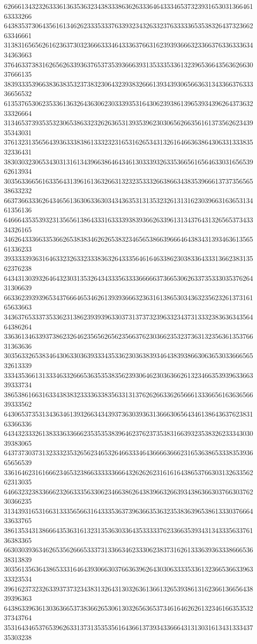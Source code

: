 62666134323263336136353632343833386362633364643334653732393165303136646163333266
64383537306435616134626233353337633932343263323763333365353832643732366263346661
31383165656261623637303236663334643336376631623939366632336637633633363434363663
37646337383162656263393637653735393666393135333533613239653664356362663037666135
38393335396638363835323738323064323938326661393439306566363134336637633336656532
61353765306235336136326436306230333935316430623938613965393439626437363233326664
31346537393535323065386332326263653139353962303065626635616137356262343935343031
37613231356564393633383861333232316531626534313261646636386430633133383532336431
38303032306534303131613439663864643461303339326335366561656463303165653962613934
30356336656163356431396161363266313232353332663866343835396661373735656538633232
66373663336264346561363063363034343635313135323261313162303966316365313461356136
64666435353932313565613864333163333938393662633961313437643132656537343334326165
34626433366335366265383834626265383234656538663966646438343139346361356561336233
39333339363164633232633233383632643335646164633862303833643331366238313562376238
64343130393264643230313532643433356333366666373665306263373533303537626431306639
66336239393965343766646534626139393666323631613865303436323562326137316165633663
34363765333735336231386239393963303731373732396332343731333238363634356464386264
33636134633937386232646235656265623566376230366235323736313235636135376631363636
30356332653834643063303639333435336230363839346438393866306365303366656532613339
33343536613133346332666536353538356239306462303636626132346635393963366339333734
38653861663163343838323333633835633131376262663362656661333665616363656639333562
64306537353134363461393266343439373630393631366630656434613864363762383163366336
64343233326138333633666235353538396462376237353831663932353832623334303039383065
64373730373132333235326562346532646633346436666366623165363865333835393665656539
33616462316166623465323866333333666432626262316161643865376630313263356262313035
64663232383366623266333563306234663862643839663266393438636630376630376230366235
31343931653166313335656631643335363739636635363235383639653861333037666433633765
38613534313866643536316132313536303364353333376233663539343134333563376136383365
66303039363462653562666533373133663462333062383731626133363936333866653638313839
30356135636438653331646439306630376636396264303063333533613236653663396333323534
39616237323263393737323438313264313032636136613265393861316236613665643839396363
64386339636130363665373836626530613032656365373461646262613234616635353237343764
35316434653765396263313731353535616436613739343366643131303161343133343735303238
